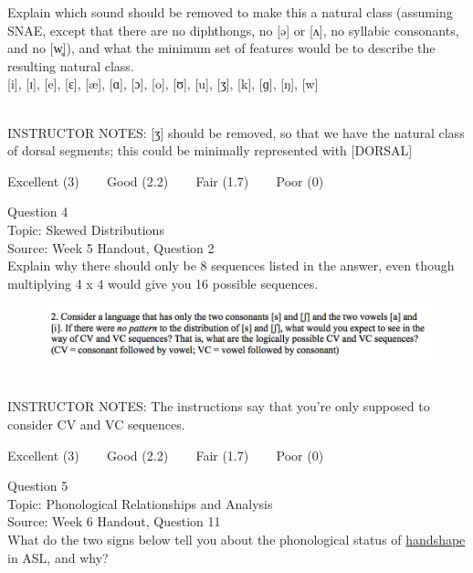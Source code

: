 \documentclass[12pt]{article}
\begin{document}
Explain which sound should be removed to make this a natural class (assuming SNAE, except that there are no diphthongs, no [ə] or [ʌ], no syllabic consonants, and no [w̥]), and what the minimum set of features would be to describe the resulting natural class.\\

{[i]}, {[ɪ]}, {[e]}, {[ɛ]}, {[æ]}, {[ɑ]}, {[ɔ]}, {[o]}, {[ʊ]}, {[u]}, {[ʒ]}, {[k]}, {[ɡ]}, {[ŋ]}, {[w]}


~\\
INSTRUCTOR NOTES: [ʒ] should be removed, so that we have the natural class of dorsal segments; this could be minimally represented with [DORSAL]


\vfill
Excellent (3) ~~~ Good (2.2) ~~~ Fair (1.7) ~~~ Poor (0)
\newpage

{\large Question 4}\\

Topic: Skewed Distributions\\
Source: Week 5 Handout, Question 2\\

Explain why there should only be 8 sequences listed in the answer, even though multiplying 4 x 4 would give you 16 possible sequences.\\

\begin{figure}[H]
\includegraphics{../images/skew2.png}
\end{figure}

~\\
INSTRUCTOR NOTES: The instructions say that you're only supposed to consider CV and VC sequences. 


\vfill
Excellent (3) ~~~ Good (2.2) ~~~ Fair (1.7) ~~~ Poor (0)
\newpage

{\large Question 5}\\

Topic: Phonological Relationships and Analysis\\
Source: Week 6 Handout, Question 11\\

What do the two signs below tell you about the phonological status of \underline{handshape} in ASL, and why?\\
\end{document}
